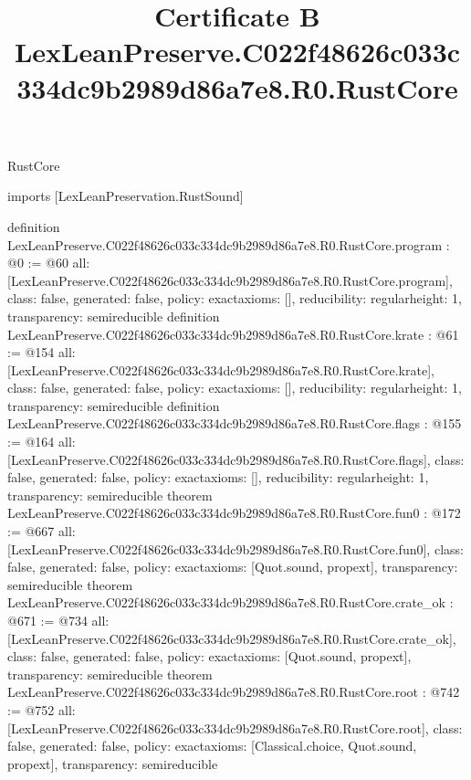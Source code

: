 \begin{lexlean}{RustCore}
\title{Certificate B LexLeanPreserve.C022f48626c033c334dc9b2989d86a7e8.R0.RustCore}
\begin{coremodule}
imports [LexLeanPreservation.RustSound]

definition LexLeanPreserve.C022f48626c033c334dc9b2989d86a7e8.R0.RustCore.program : @0 := @60 {
  all: [LexLeanPreserve.C022f48626c033c334dc9b2989d86a7e8.R0.RustCore.program],
  class: false,
  generated: false,
  policy: exact{axioms: []},
  reducibility: regular{height: 1},
  transparency: semireducible
}
definition LexLeanPreserve.C022f48626c033c334dc9b2989d86a7e8.R0.RustCore.krate : @61 := @154 {
  all: [LexLeanPreserve.C022f48626c033c334dc9b2989d86a7e8.R0.RustCore.krate],
  class: false,
  generated: false,
  policy: exact{axioms: []},
  reducibility: regular{height: 1},
  transparency: semireducible
}
definition LexLeanPreserve.C022f48626c033c334dc9b2989d86a7e8.R0.RustCore.flags : @155 := @164 {
  all: [LexLeanPreserve.C022f48626c033c334dc9b2989d86a7e8.R0.RustCore.flags],
  class: false,
  generated: false,
  policy: exact{axioms: []},
  reducibility: regular{height: 1},
  transparency: semireducible
}
theorem LexLeanPreserve.C022f48626c033c334dc9b2989d86a7e8.R0.RustCore.fun0 : @172 := @667 {
  all: [LexLeanPreserve.C022f48626c033c334dc9b2989d86a7e8.R0.RustCore.fun0],
  class: false,
  generated: false,
  policy: exact{axioms: [Quot.sound, propext]},
  transparency: semireducible
}
theorem LexLeanPreserve.C022f48626c033c334dc9b2989d86a7e8.R0.RustCore.crate_ok : @671 := @734 {
  all: [LexLeanPreserve.C022f48626c033c334dc9b2989d86a7e8.R0.RustCore.crate_ok],
  class: false,
  generated: false,
  policy: exact{axioms: [Quot.sound, propext]},
  transparency: semireducible
}
theorem LexLeanPreserve.C022f48626c033c334dc9b2989d86a7e8.R0.RustCore.root : @742 := @752 {
  all: [LexLeanPreserve.C022f48626c033c334dc9b2989d86a7e8.R0.RustCore.root],
  class: false,
  generated: false,
  policy: exact{axioms: [Classical.choice, Quot.sound, propext]},
  transparency: semireducible
}


\end{coremodule}
\end{lexlean}
